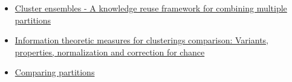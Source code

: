 \documentclass[12 pts]{article}
\begin{document}
\begin{itemize}
\item \href{https://www.scopus.com/record/display.uri?eid=2-s2.0-1942450753&origin=inward}{Cluster ensembles - A knowledge reuse framework for combining multiple partitions}

\item \href{https://www.scopus.com/record/display.uri?eid=2-s2.0-78649420560&origin=inward}{Information theoretic measures for clusterings comparison: Variants, properties, normalization and correction for chance}

\item \href{https://link.springer.com/article/10.1007/BF01908075}{Comparing partitions}



\end{itemize}
\end{document}
